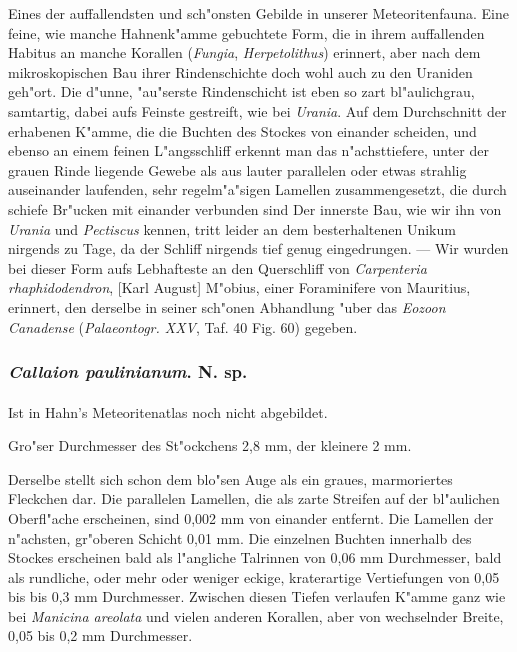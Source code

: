 \documentclass[a4paper, 11pt, oneside]{article}
\begin{document}
Eines der auffallendsten und sch"onsten Gebilde in unserer Meteoritenfauna. Eine feine, wie manche Hahnenk"amme gebuchtete Form, die in ihrem auffallenden Habitus an manche Korallen (\emph{Fungia}, \emph{Herpetolithus}) erinnert, aber nach dem mikroskopischen Bau ihrer Rindenschichte doch wohl auch zu den Uraniden geh"ort. Die d"unne, "au"serste Rindenschicht ist eben so zart bl"aulichgrau, samtartig, dabei aufs Feinste gestreift, wie bei \emph{Urania}. Auf dem Durchschnitt der erhabenen K"amme, die die Buchten des Stockes von einander scheiden, und ebenso an einem feinen L"angsschliff erkennt man das n"achsttiefere, unter der grauen Rinde liegende Gewebe als aus lauter parallelen oder etwas strahlig auseinander laufenden, sehr regelm"a"sigen Lamellen zusammengesetzt, die durch schiefe Br"ucken mit einander verbunden sind Der innerste Bau, wie wir ihn von \emph{Urania} und \emph{Pectiscus} kennen, tritt leider an dem besterhaltenen Unikum nirgends zu Tage, da der Schliff nirgends tief genug eingedrungen. --- Wir wurden bei dieser Form aufs Lebhafteste an den Querschliff von \emph{Carpenteria rhaphidodendron}, [Karl August] M"obius, einer Foraminifere von Mauritius, erinnert, den derselbe in seiner sch"onen Abhandlung "uber das \emph{Eozoon Canadense} (\emph{Palaeontogr. XXV}, Taf. 40 Fig. 60) gegeben.
\subsubsection{\emph{Callaion paulinianum}. N. sp.}
\paragraph{}
Ist in Hahn's Meteoritenatlas noch nicht abgebildet.

Gro"ser Durchmesser des St"ockchens 2,8 mm, der kleinere 2 mm.

Derselbe stellt sich schon dem blo"sen Auge als ein graues, marmoriertes Fleckchen dar. Die parallelen Lamellen, die als zarte Streifen auf der bl"aulichen Oberfl"ache erscheinen, sind 0,002 mm von einander entfernt. Die Lamellen der n"achsten, gr"oberen Schicht 0,01 mm. Die einzelnen Buchten innerhalb des Stockes erscheinen bald als l"angliche Talrinnen von 0,06 mm Durchmesser, bald als rundliche, oder mehr oder weniger eckige, kraterartige Vertiefungen von 0,05 bis bis 0,3 mm Durchmesser. Zwischen diesen Tiefen verlaufen K"amme ganz wie bei \emph{Manicina areolata} und vielen anderen Korallen, aber von wechselnder Breite, 0,05 bis 0,2 mm Durchmesser.
\end{document}
